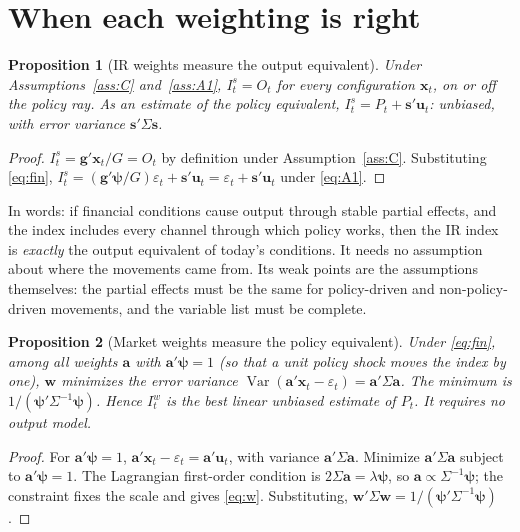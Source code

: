 \documentclass[11pt]{article}
\newtheorem{proposition}{Proposition}
\theoremstyle{definition}
\theoremstyle{remark}
\newcommand{\Var}{\operatorname{Var}}
\newcommand{\bpsi}{\boldsymbol{\psi}}
\newcommand{\bx}{\mathbf{x}}
\newcommand{\bu}{\mathbf{u}}
\newcommand{\bg}{\mathbf{g}}
\newcommand{\bs}{\mathbf{s}}
\newcommand{\bw}{\mathbf{w}}
\newcommand{\ba}{\mathbf{a}}
\begin{document}
\section{When each weighting is right}

\begin{proposition}[IR weights measure the output equivalent]\label{prop:IR}
Under Assumptions~\ref{ass:C} and~\ref{ass:A1}, $I^s_t = O_t$ for every configuration $\bx_t$, on or off the policy ray. As an estimate of the policy equivalent, $I^s_t = P_t + \bs'\bu_t$: unbiased, with error variance $\bs'\Sigma\bs$.
\end{proposition}

\begin{proof}
$I^s_t = \bg'\bx_t/G = O_t$ by definition under Assumption~\ref{ass:C}. Substituting \eqref{eq:fin}, $I^s_t = (\bg'\bpsi/G)\varepsilon_t + \bs'\bu_t = \varepsilon_t + \bs'\bu_t$ under \eqref{eq:A1}.
\end{proof}

\noindent In words: if financial conditions cause output through stable partial effects, and the index includes every channel through which policy works, then the IR index is \emph{exactly} the output equivalent of today's conditions. It needs no assumption about where the movements came from. Its weak points are the assumptions themselves: the partial effects must be the same for policy-driven and non-policy-driven movements, and the variable list must be complete.

\begin{proposition}[Market weights measure the policy equivalent]\label{prop:GLS}
Under \eqref{eq:fin}, among all weights $\ba$ with $\ba'\bpsi=1$ (so that a unit policy shock moves the index by one), $\bw$ minimizes the error variance $\Var(\ba'\bx_t - \varepsilon_t)=\ba'\Sigma\ba$. The minimum is $1/(\bpsi'\Sigma^{-1}\bpsi)$. Hence $I^w_t$ is the best linear unbiased estimate of $P_t$. It requires no output model.
\end{proposition}

\begin{proof}
For $\ba'\bpsi=1$, $\ba'\bx_t-\varepsilon_t=\ba'\bu_t$, with variance $\ba'\Sigma\ba$. Minimize $\ba'\Sigma\ba$ subject to $\ba'\bpsi=1$. The Lagrangian first-order condition is $2\Sigma\ba=\lambda\bpsi$, so $\ba\propto\Sigma^{-1}\bpsi$; the constraint fixes the scale and gives \eqref{eq:w}. Substituting, $\bw'\Sigma\bw = 1/(\bpsi'\Sigma^{-1}\bpsi)$.
\end{proof}
\end{document}
